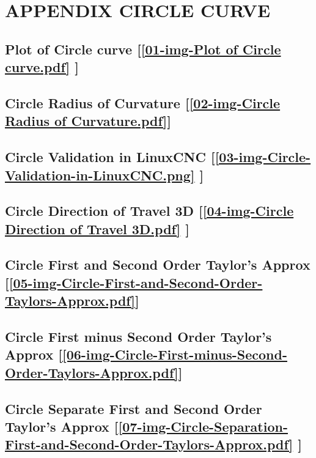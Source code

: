 \section{\textbf{APPENDIX CIRCLE CURVE}} \label{APPENDIX CIRCLE CURVE}

\subsection       {Plot of Circle curve
[\ref      {01-img-Plot of Circle curve.pdf} ] }
\label{ssec-01-img-Plot of Circle curve.pdf}

\subsection       {Circle Radius of Curvature
[\ref      {02-img-Circle Radius of Curvature.pdf}] }
\label{ssec-02-img-Circle Radius of Curvature.pdf}

\subsection       {Circle Validation in LinuxCNC
[\ref      {03-img-Circle-Validation-in-LinuxCNC.png} ] }
\label{ssec-03-img-Circle-Validation-in-LinuxCNC.png}

\subsection     {Circle Direction of Travel 3D
[\ref      {04-img-Circle Direction of Travel 3D.pdf} ] }
\label{ssec-04-img-Circle Direction of Travel 3D.pdf}

\subsection       {Circle First and Second Order Taylor's Approx
[\ref      {05-img-Circle-First-and-Second-Order-Taylors-Approx.pdf}] }
\label{ssec-05-img-Circle-First-and-Second-Order-Taylors-Approx.pdf}

\subsection       {Circle First minus Second Order Taylor's Approx
[\ref      {06-img-Circle-First-minus-Second-Order-Taylors-Approx.pdf}] }
\label{ssec-06-img-Circle-First-minus-Second-Order-Taylors-Approx.pdf}

\subsection       {Circle Separate First and Second Order Taylor's Approx
[\ref      {07-img-Circle-Separation-First-and-Second-Order-Taylors-Approx.pdf} ] }
\label{ssec-07-img-Circle-Separation-First-and-Second-Order-Taylors-Approx.pdf}

